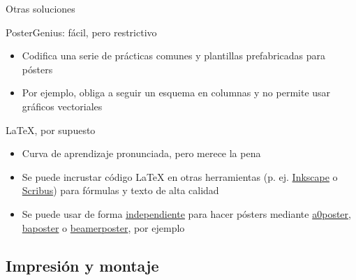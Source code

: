 \documentclass[xcolor=svgnames,compress]{beamer}
\begin{document}
\begin{frame}{Otras soluciones}

  \begin{block}{PosterGenius: fácil, pero restrictivo}
    \begin{itemize}
    \item Codifica una serie de prácticas comunes y plantillas
      prefabricadas para pósters
    \item Por ejemplo, obliga a seguir un esquema en columnas y no
      permite usar gráficos vectoriales
    \end{itemize}
  \end{block}

  \begin{block}{\LaTeX, por supuesto \Smiley}
    \begin{itemize}
    \item Curva de aprendizaje pronunciada, pero merece la pena
    \item Se puede incrustar código \LaTeX{} en otras herramientas
      (p. ej. \href{http://blogs.ethz.ch/kowalski/2011/10/05/inkscape-and-latex/}{Inkscape}
      o
      \href{http://www.mostlymaths.net/2010/11/mathematics-poster-dropbox-scribus-and.html}{Scribus})
      para fórmulas y texto de alta calidad
    \item Se puede usar de forma
      \href{http://www.tex.ac.uk/cgi-bin/texfaq2html?label=poster}{independiente}
      para hacer pósters mediante
      \href{http://nxg.me.uk/docs/posters/}{a0poster}, \href{http://www.brian-amberg.de/uni/poster/}{baposter} o
      \href{http://www-i6.informatik.rwth-aachen.de/~dreuw/latexbeamerposter.php}{beamerposter},
      por ejemplo
    \end{itemize}
  \end{block}
  
\end{frame}

\subsection{Impresión y montaje}
\end{document}

